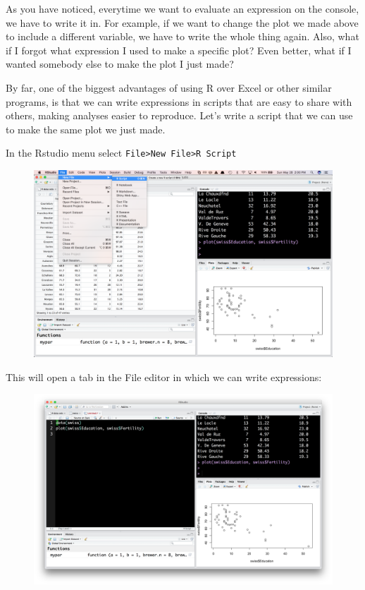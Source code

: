 \documentclass[12pt,]{book}
\theoremstyle{definition}
\theoremstyle{definition}
\theoremstyle{definition}
\theoremstyle{remark}
\begin{document}
As you have noticed, everytime we want to evaluate an expression on the
console, we have to write it in. For example, if we want to change the
plot we made above to include a different variable, we have to write the
whole thing again. Also, what if I forgot what expression I used to make
a specific plot? Even better, what if I wanted somebody else to make the
plot I just made?

By far, one of the biggest advantages of using R over Excel or other
similar programs, is that we can write expressions in scripts that are
easy to share with others, making analyses easier to reproduce. Let's
write a script that we can use to make the same plot we just made.

In the Rstudio menu select
\texttt{File\textgreater{}New\ File\textgreater{}R\ Script}

\begin{figure}
\centering
\includegraphics{img/rstudio_new_script.png}
\caption{}
\end{figure}

This will open a tab in the File editor in which we can write
expressions:

\begin{figure}
\centering
\includegraphics{img/rstudio_file.png}
\caption{}
\end{figure}
\end{document}
